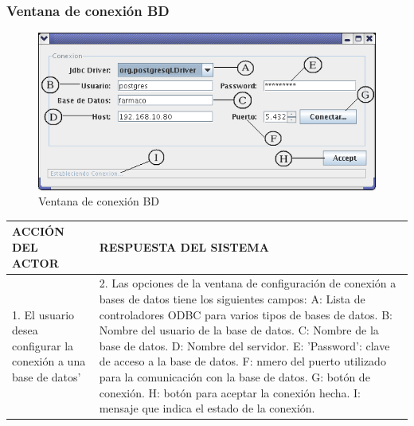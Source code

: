 \subsubsection{Ventana de conexi\'on BD}
\begin{figure}[ht]
\centering
\includegraphics[width=1\textwidth]{images/11.png}
\caption{Ventana de conexi\'on BD}
\end{figure}
\begin{center}
\begin{tabular}{|p{60mm}|p{60mm}|} \hline
ACCI\'ON DEL ACTOR & RESPUESTA DEL SISTEMA \\ \hline
1. El usuario desea configurar la conexi\'on a una base de datos'  & 2. Las opciones de la ventana de configuraci\'on de conexi\'on a bases de datos tiene los siguientes campos: A: Lista de controladores ODBC para varios tipos de bases de datos. B: Nombre del usuario de la base de datos. C: Nombre de la base de datos. D: Nombre del servidor. E: 'Password': clave de acceso a la base de datos. F: nmero del puerto utilizado para la comunicaci\'on con la base de datos. G: bot\'on de conexi\'on. H: bot\'on para aceptar la conexi\'on hecha. I: mensaje que indica el estado de la conexi\'on. \\ \hline
\end{tabular}
\end{center}

\newpage
